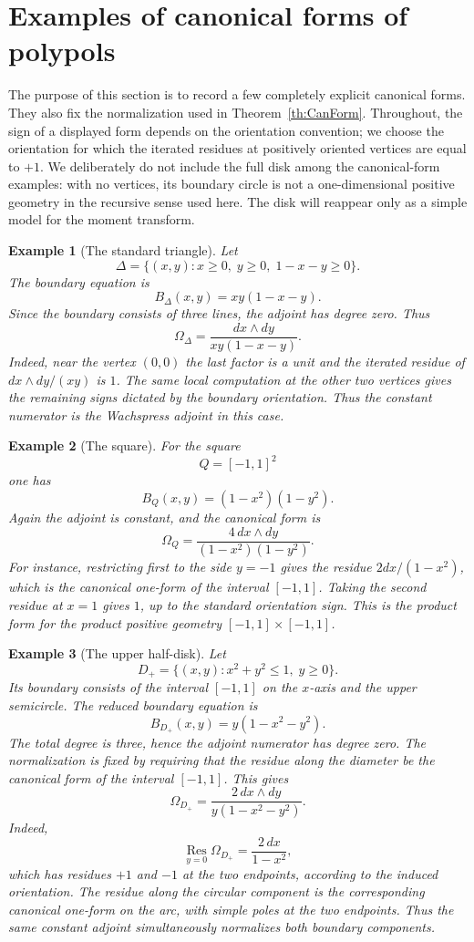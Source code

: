 \documentclass[10pt,a4paper,reqno]{amsart}
\newtheorem{example} {Example}
\theoremstyle{plain}
\theoremstyle{definition}
\begin{document}
\section{Examples of canonical forms of polypols}


The purpose of this section is to record a few completely explicit canonical
forms.  They also fix the normalization used in Theorem~\ref{th:CanForm}.
Throughout, the sign of a displayed form depends on the orientation convention;
we choose the orientation for which the iterated residues at positively oriented
vertices are equal to $+1$.  We deliberately do not include the full disk among
the canonical-form examples: with no vertices, its boundary circle is not a
one-dimensional positive geometry in the recursive sense used here.  The disk
will reappear only as a simple model for the moment transform.

\begin{example}[The standard triangle]
Let
\[
        \Delta=\{(x,y):x\geq0,\; y\geq0,\; 1-x-y\geq0\}.
\]
The boundary equation is
\[
        B_\Delta(x,y)=xy(1-x-y).
\]
Since the boundary consists of three lines, the adjoint has degree zero.  Thus
\[
        \Omega_\Delta=\frac{dx\wedge dy}{xy(1-x-y)} .
\]
Indeed, near the vertex $(0,0)$ the last factor is a unit and the iterated
residue of $dx\wedge dy/(xy)$ is $1$.  The same local computation at the other
two vertices gives the remaining signs dictated by the boundary orientation.
Thus the constant numerator is the Wachspress adjoint in this case.
\end{example}

\begin{example}[The square]
For the square
\[
        Q=[-1,1]^2
\]
one has
\[
        B_Q(x,y)=(1-x^2)(1-y^2).
\]
Again the adjoint is constant, and the canonical form is
\[
        \Omega_Q=\frac{4\,dx\wedge dy}{(1-x^2)(1-y^2)} .
\]
For instance, restricting first to the side $y=-1$ gives the residue
$2dx/(1-x^2)$, which is the canonical one-form of the interval $[-1,1]$.
Taking the second residue at $x=1$ gives $1$, up to the standard orientation
sign.  This is the product form for the product positive geometry
$[-1,1]\times[-1,1]$.
\end{example}

\begin{example}[The upper half-disk]
Let
\[
        D_+=\{(x,y):x^2+y^2\leq1,\; y\geq0\}.
\]
Its boundary consists of the interval $[-1,1]$ on the $x$-axis and the upper
semicircle.  The reduced boundary equation is
\[
        B_{D_+}(x,y)=y(1-x^2-y^2).
\]
The total degree is three, hence the adjoint numerator has degree zero.  The
normalization is fixed by requiring that the residue along the diameter be the
canonical form of the interval $[-1,1]$.  This gives
\[
        \Omega_{D_+}=\frac{2\,dx\wedge dy}{y(1-x^2-y^2)} .
\]
Indeed,
\[
        \operatorname*{Res}_{y=0}\Omega_{D_+}
        =\frac{2\,dx}{1-x^2},
\]
which has residues $+1$ and $-1$ at the two endpoints, according to the induced
orientation.  The residue along the circular component is the corresponding
canonical one-form on the arc, with simple poles at the two endpoints.  Thus the
same constant adjoint simultaneously normalizes both boundary components.
\end{example}
\end{document}

